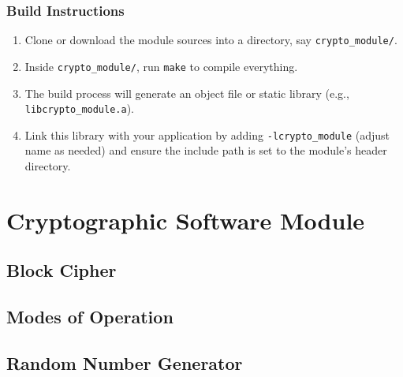 \documentclass[11pt,a4paper]{report}
\theoremstyle{definitionstyle}
\begin{document}
\subsection{Build Instructions}

\begin{enumerate}
	\item Clone or download the module sources into a directory, say \texttt{crypto\_module/}.
	\item Inside \texttt{crypto\_module/}, run \texttt{make} to compile everything.
	\item The build process will generate an object file or static library (e.g., \texttt{libcrypto\_module.a}).
	\item Link this library with your application by adding \texttt{-lcrypto\_module} (adjust name as needed) and ensure the include path is set to the module's header directory.
\end{enumerate}

\newpage
\chapter{Cryptographic Software Module}

\section{Block Cipher}


\section{Modes of Operation}

\section{Random Number Generator}
\end{document}
